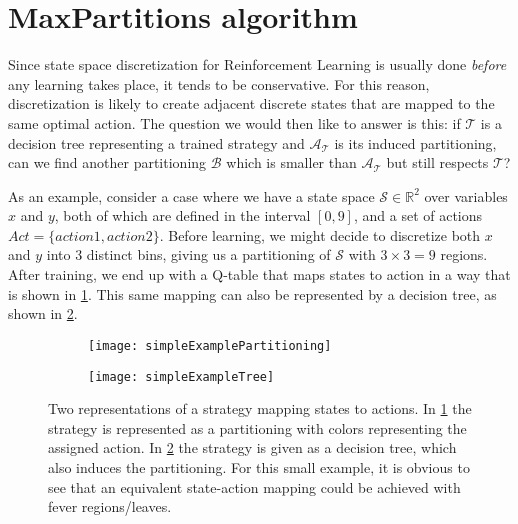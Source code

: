 \section{MaxPartitions algorithm}%
\label{sec:maxParts}

Since state space discretization for Reinforcement Learning is usually done
\textit{before} any learning takes place, it tends to be conservative. For this
reason, discretization is likely to create adjacent discrete states that are
mapped to the same optimal action. The question we would then like to answer is
this: if $\mathcal{T}$ is a decision tree representing a trained strategy and
$\mathcal{A}_{\mathcal{T}}$ is its induced partitioning, can we find another
partitioning $\mathcal{B}$ which is smaller than $\mathcal{A}_{\mathcal{T}}$ but
still respects $\mathcal{T}$?

As an example, consider a case where we have a state space $\mathcal{S} \in
\mathbb{R}^2$ over variables $x$ and $y$, both of which are defined in the
interval $[0,9]$, and a set of actions $Act = \{ action1, action2 \}$. Before
learning, we might decide to discretize both $x$ and $y$ into 3 distinct bins,
giving us a partitioning of $\mathcal{S}$ with $3\times3 = 9$ regions. After
training, we end up with a Q-table that maps states to action in a way that is
shown in \cref{fig:simpleExamplePartitioning}. This same mapping can also be
represented by a decision tree, as shown in \cref{fig:simpleExampleTree}.

\begin{figure}[ht]
    \centering
    \begin{subfigure}{0.4\textwidth}
        \texttt{[image: simpleExamplePartitioning]}%
        \caption{}%
        \label{fig:simpleExamplePartitioning}
    \end{subfigure}
    \begin{subfigure}{0.4\textwidth}
      \texttt{[image: simpleExampleTree]}%
      \caption{}%
      \label{fig:simpleExampleTree}
    \end{subfigure}

  \caption{%
    Two representations of a strategy mapping states to actions. In
    \cref{fig:simpleExamplePartitioning} the strategy is represented as a
    partitioning with colors representing the assigned action. In
    \cref{fig:simpleExampleTree} the strategy is given as a decision
    tree, which also induces the partitioning. For this small example, it is
    obvious to see that an equivalent state-action mapping could be achieved
    with fever regions/leaves.
  }%
  \label{fig:simpleExample}
\end{figure}

